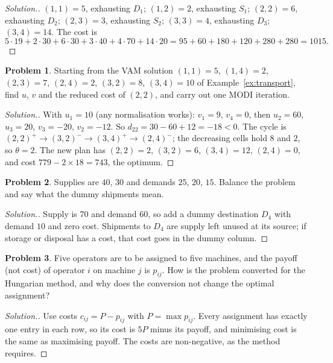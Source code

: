 \documentclass[11pt,a4paper]{article}
\numberwithin{equation}{section}
\theoremstyle{definition}
\newtheorem{problemx}{Problem}[subsection]
\newenvironment{problem}{\begin{problemx}}{\end{problemx}}
\newenvironment{solution}
  {\renewcommand{\qedsymbol}{}\begin{proof}[\textit{Solution}.]}
  {\end{proof}}
\begin{document}
\begin{solution}
$(1, 1) = 5$, exhausting $D_1$; $(1, 2) = 2$, exhausting $S_1$; $(2, 2) = 6$, exhausting $D_2$; $(2, 3) = 3$, exhausting $S_2$; $(3, 3) = 4$, exhausting $D_3$; $(3, 4) = 14$. The cost is
\[
5\cdot 19 + 2\cdot 30 + 6\cdot 30 + 3\cdot 40 + 4\cdot 70 + 14\cdot 20 = 95 + 60 + 180 + 120 + 280 + 280 = 1015 .
\]
\end{solution}

\begin{problem}
Starting from the VAM solution $(1, 1) = 5$, $(1, 4) = 2$, $(2, 3) = 7$, $(2, 4) = 2$, $(3, 2) = 8$, $(3, 4) = 10$ of Example~\ref{ex:transport}, find $u$, $v$ and the reduced cost of $(2, 2)$, and carry out one MODI iteration.
\end{problem}

\begin{solution}
With $u_1 = 10$ (any normalisation works): $v_1 = 9$, $v_4 = 0$, then $u_2 = 60$, $u_3 = 20$, $v_3 = -20$, $v_2 = -12$. So $d_{22} = 30 - 60 + 12 = -18 < 0$. The cycle is $(2, 2)^+ \to (3, 2)^- \to (3, 4)^+ \to (2, 4)^-$; the decreasing cells hold $8$ and $2$, so $\theta = 2$. The new plan has
$(2, 2) = 2$, $(3, 2) = 6$, $(3, 4) = 12$, $(2, 4) = 0$, and cost $779 - 2 \times 18 = 743$, the optimum.
\end{solution}

\begin{problem}
Supplies are $40$, $30$ and demands $25$, $20$, $15$. Balance the problem and say what the dummy shipments mean.
\end{problem}

\begin{solution}
Supply is $70$ and demand $60$, so add a dummy destination $D_4$ with demand $10$ and zero cost. Shipments to $D_4$ are supply left unused at its source; if storage or disposal has a cost, that cost goes in the dummy column.
\end{solution}

\begin{problem}
Five operators are to be assigned to five machines, and the payoff (not cost) of operator $i$ on machine $j$ is $p_{ij}$. How is the problem converted for the Hungarian method, and why does the conversion not change the optimal assignment?
\end{problem}

\begin{solution}
Use costs $c_{ij} = P - p_{ij}$ with $P = \max p_{ij}$. Every assignment has exactly one entry in each row, so its cost is $5P$ minus its payoff, and minimising cost is the same as maximising payoff. The costs are non-negative, as the method requires.
\end{solution}
\end{document}
